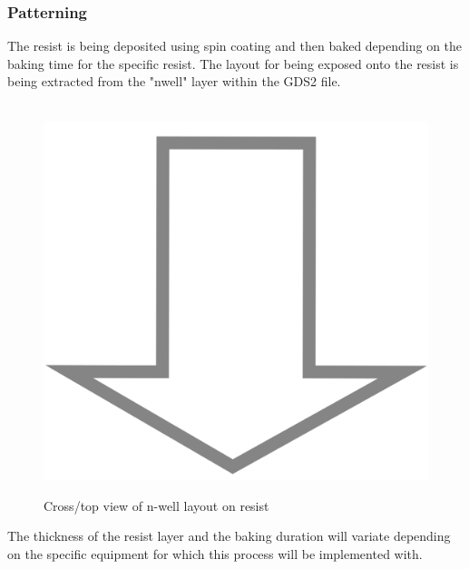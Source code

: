\subsubsection{Patterning}
The resist is being deposited using spin coating and then baked depending on the baking time for the specific resist.
The layout for being exposed onto the resist is being extracted from the "nwell" layer within the GDS2 file.
\begin{figure}[H]
	\centering
	\begin{tikzpicture}[node distance = 3cm, auto, thick,scale=\CrossAndTopSection, every node/.style={transform shape}]
		
	\end{tikzpicture}
	\begin{tikzpicture}[node distance = 3cm, auto, thick,scale=\CrossAndTopSection, every node/.style={transform shape}]
		
	\end{tikzpicture} \\
	\includegraphics[scale=0.01]{down_arrow.png} \\
	\begin{tikzpicture}[node distance = 3cm, auto, thick,scale=\CrossAndTopSection, every node/.style={transform shape}]
		
	\end{tikzpicture}
	\begin{tikzpicture}[node distance = 3cm, auto, thick,scale=\CrossAndTopSection, every node/.style={transform shape}]
		
	\end{tikzpicture}
	\caption{Cross/top view of n-well layout on resist}
\end{figure}
The thickness of the resist layer and the baking duration will variate depending on the specific equipment for which this process will be implemented with.


